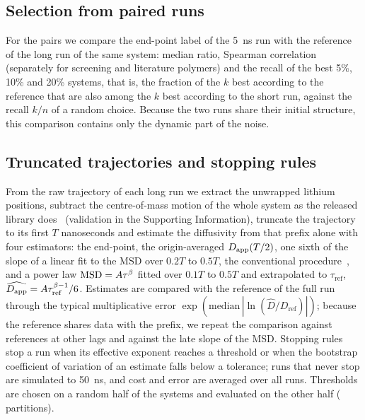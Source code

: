 \documentclass[journal=jcisd8,manuscript=article,email=true]{achemso}
\begin{document}
\subsection{Selection from paired runs}\label{sec:selection-method}
For the \nPairs{} pairs we compare the end-point label of the \SI{5}{\nano\second} run with the
reference of the long run of the same system: median ratio, Spearman correlation (separately for
screening and literature polymers) and the recall of the best 5\%, 10\% and 20\% systems, that is,
the fraction of the $k$ best according to the reference that are also among the $k$ best according
to the short run, against the recall $k/n$ of a random choice. Because the two runs share their
initial structure, this comparison contains only the dynamic part of the noise.

\subsection{Truncated trajectories and stopping rules}\label{sec:stopping-method}
From the raw trajectory of each long run we extract the unwrapped lithium positions, subtract the
centre-of-mass motion of the whole system as the released library does~\cite{HTPMDcode} (validation
in the Supporting Information), truncate the trajectory to its first $T$ nanoseconds and estimate the
diffusivity from that prefix alone with four estimators: the end-point, the origin-averaged
$D_{\mathrm{app}}(T/2)$, one sixth of the slope of a linear fit to the MSD over $0.2T$ to $0.5T$, the
conventional procedure~\cite{Maginn2018BestPractices}, and a power law $\mathrm{MSD}=A\tau^{\beta}$ fitted
over $0.1T$ to $0.5T$ and extrapolated to $\tau_{\mathrm{ref}}$, $\widehat{D_{\mathrm{app}}}=A\tau_{\mathrm{ref}}^{\beta-1}/6$.
Estimates are compared with the reference of the full run through the typical multiplicative error
$\exp(\mathrm{median}\,|\ln(\hat D/D_{\mathrm{ref}})|)$; because the reference shares data with the
prefix, we repeat the comparison against references at other lags and against the late slope of
the MSD. Stopping rules stop a run when its effective exponent reaches a threshold or when the
bootstrap coefficient of variation of an estimate falls below a tolerance; runs that never stop are
simulated to \SI{50}{\nano\second}, and cost and error are averaged over all runs. Thresholds are
chosen on a random half of the systems and evaluated on the other half (\frSplits{} partitions).
\end{document}
